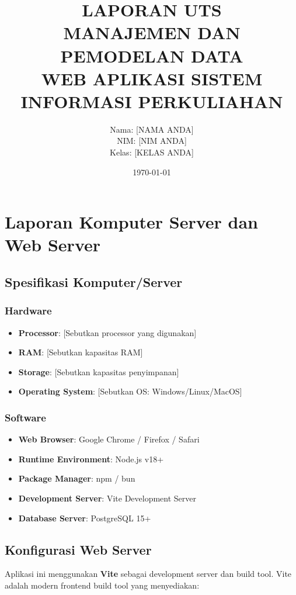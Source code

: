 \documentclass[12pt,a4paper]{article}
\title{\textbf{LAPORAN UTS\\MANAJEMEN DAN PEMODELAN DATA\\WEB APLIKASI SISTEM INFORMASI PERKULIAHAN}}
\author{Nama: [NAMA ANDA]\\NIM: [NIM ANDA]\\Kelas: [KELAS ANDA]}
\date{\today}
\begin{document}
\maketitle
\newpage

\tableofcontents
\newpage

\section{Laporan Komputer Server dan Web Server}

\subsection{Spesifikasi Komputer/Server}

\subsubsection{Hardware}
\begin{itemize}
    \item \textbf{Processor}: [Sebutkan processor yang digunakan]
    \item \textbf{RAM}: [Sebutkan kapasitas RAM]
    \item \textbf{Storage}: [Sebutkan kapasitas penyimpanan]
    \item \textbf{Operating System}: [Sebutkan OS: Windows/Linux/MacOS]
\end{itemize}

\subsubsection{Software}
\begin{itemize}
    \item \textbf{Web Browser}: Google Chrome / Firefox / Safari
    \item \textbf{Runtime Environment}: Node.js v18+
    \item \textbf{Package Manager}: npm / bun
    \item \textbf{Development Server}: Vite Development Server
    \item \textbf{Database Server}: PostgreSQL 15+
\end{itemize}

\subsection{Konfigurasi Web Server}

Aplikasi ini menggunakan \textbf{Vite} sebagai development server dan build tool. Vite adalah modern frontend build tool yang menyediakan:
\end{document}
